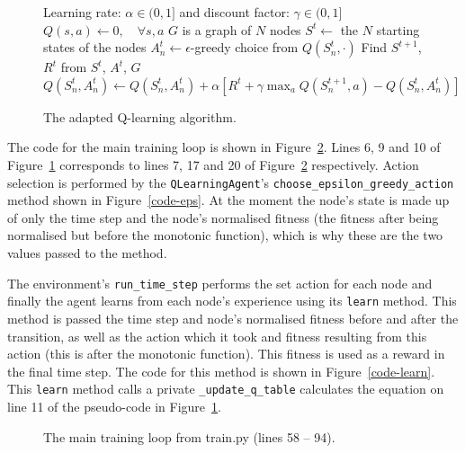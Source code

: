 \documentclass[a4paper]{article}
\begin{document}
\begin{figure}[H]
\begin{framed}
\begin{algorithmic}[1]
    \REQUIRE Learning rate: $\alpha \in (0, 1]$
    and discount factor: $\gamma \in (0, 1]$
    \STATE $Q(s, a) \gets 0, \quad\forall s, a$
    \STATE $G$ is a graph of $N$ nodes
    \STATE $S^t \gets$ the $N$ starting states of the nodes
    \STATE $A^t_n \gets \epsilon$-greedy choice from $Q(S^t_n, \cdot)$
    \ENDFOR
    \STATE Find $S^{t+1}$, $R^t$ from $S^t$, $A^t$, $G$
    \STATE $Q(S^t_n, A^t_n) \leftarrow Q(S^t_n, A^t_n)
    + \alpha [R^t + \gamma \max_a Q(S^{t+1}_n, a) - Q(S^t_n, A^t_n)]$
    \ENDFOR
    \ENDFOR
    \ENDFOR
\end{algorithmic}
\end{framed}
\caption{The adapted Q-learning algorithm.}
\label{my}
\end{figure}

The code for the main training loop is shown in Figure~\ref{code-main}.
Lines 6, 9 and 10 of Figure~\ref{my} corresponds to lines 7, 17 and 20
of Figure~\ref{code-main} respectively.
Action selection is performed by the \texttt{QLearningAgent}'s
\texttt{choose\_epsilon\_greedy\_action} method shown in Figure~\ref{code-eps}.
At the moment the node's state is made up of only
the time step and the node's normalised fitness
(the fitness after being normalised but before the monotonic function),
which is why these are the two values passed to the method.

The environment's \texttt{run\_time\_step} performs the set action
for each node and finally the agent learns from each node's experience
using its \texttt{learn} method.
This method is passed the time step and node's normalised fitness before
and after the transition,
as well as the action which it took and fitness resulting from this action
(this is after the monotonic function).
This fitness is used as a reward in the final time step.
The code for this method is shown in Figure~\ref{code-learn}.
This \texttt{learn} method calls a private \texttt{\_update\_q\_table}
calculates the equation on line 11 of the pseudo-code in Figure~\ref{my}.

\begin{figure}[H]

\caption{The main training loop from train.py (lines 58 -- 94).}
\label{code-main}
\end{figure}
\end{document}
